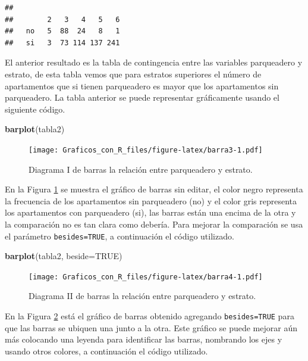 \documentclass[10pt,]{krantz}
\makeatletter
\newenvironment{Shaded}{\begin{snugshade}}{\end{snugshade}}
\newcommand{\KeywordTok}[1]{\textcolor[rgb]{0.13,0.29,0.53}{\textbf{#1}}}
\newcommand{\DataTypeTok}[1]{\textcolor[rgb]{0.13,0.29,0.53}{#1}}
\newcommand{\OtherTok}[1]{\textcolor[rgb]{0.56,0.35,0.01}{#1}}
\newcommand{\NormalTok}[1]{#1}
\newenvironment{kframe}{%
\medskip{}
\setlength{\fboxsep}{.8em}
 \def\at@end@of@kframe{}%
 \ifinner\ifhmode%
  \def\at@end@of@kframe{\end{minipage}}%
  \begin{minipage}{\columnwidth}%
 \fi\fi%
 \def\FrameCommand##1{\hskip\@totalleftmargin \hskip-\fboxsep
 \colorbox{shadecolor}{##1}\hskip-\fboxsep
     \hskip-\linewidth \hskip-\@totalleftmargin \hskip\columnwidth}%
 \MakeFramed {\advance\hsize-\width
   \@totalleftmargin\z@ \linewidth\hsize
   \@setminipage}}%
 {\par\unskip\endMakeFramed%
 \at@end@of@kframe}
\renewenvironment{Shaded}{\begin{kframe}}{\end{kframe}}
\makeatother
\begin{document}
\begin{verbatim}
##     
##        2   3   4   5   6
##   no   5  88  24   8   1
##   si   3  73 114 137 241
\end{verbatim}

El anterior resultado es la tabla de contingencia entre las variables
parqueadero y estrato, de esta tabla vemos que para estratos superiores
el número de apartamentos que si tienen parqueadero es mayor que los
apartamentos sin parqueadero. La tabla anterior se puede representar
gráficamente usando el siguiente código.

\begin{Shaded}
\begin{Highlighting}[]
\KeywordTok{barplot}\NormalTok{(tabla2)}
\end{Highlighting}
\end{Shaded}

\begin{figure}
\centering
\texttt{[image: Graficos\_con\_R\_files/figure-latex/barra3-1.pdf]}
\caption{\label{fig:barra3}Diagrama I de barras la relación entre
parqueadero y estrato.}
\end{figure}

En la Figura \ref{fig:barra3} se muestra el gráfico de barras sin
editar, el color negro representa la frecuencia de los apartamentos sin
parqueadero (no) y el color gris representa los apartamentos con
parqueadero (si), las barras están una encima de la otra y la
comparación no es tan clara como debería. Para mejorar la comparación se
usa el parámetro \texttt{besides=TRUE}, a continuación el código
utilizado.

\begin{Shaded}
\begin{Highlighting}[]
\KeywordTok{barplot}\NormalTok{(tabla2, }\DataTypeTok{beside=}\OtherTok{TRUE}\NormalTok{)}
\end{Highlighting}
\end{Shaded}

\begin{figure}
\centering
\texttt{[image: Graficos\_con\_R\_files/figure-latex/barra4-1.pdf]}
\caption{\label{fig:barra4}Diagrama II de barras la relación entre
parqueadero y estrato.}
\end{figure}

En la Figura \ref{fig:barra4} está el gráfico de barras obtenido
agregando \texttt{besides=TRUE} para que las barras se ubiquen una junto
a la otra. Este gráfico se puede mejorar aún más colocando una leyenda
para identificar las barras, nombrando los ejes y usando otros colores,
a continuación el código utilizado.
\end{document}
